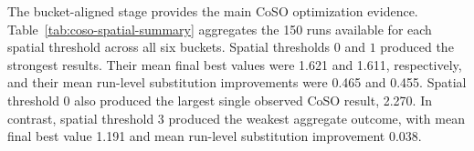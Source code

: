 
The bucket-aligned stage provides the main CoSO optimization evidence. Table~\ref{tab:coso-spatial-summary} aggregates the 150 runs available for each spatial threshold across all six buckets. Spatial thresholds \(0\) and \(1\) produced the strongest results. Their mean final best values were 
1.621 and 1.611, 
respectively, and their mean run-level substitution improvements were 
0.465 and 0.455. 
Spatial threshold \(0\) also produced the largest single observed CoSO result, 
2.270. 
In contrast, spatial threshold \(3\) produced the weakest aggregate outcome, with mean final best value 1.191 and mean run-level substitution improvement 
0.038.


